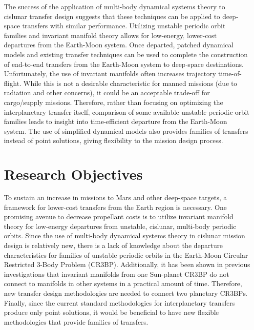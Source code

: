 The success of the application of multi-body dynamical systems theory to cislunar transfer design
suggests that these techniques can be applied to deep-space transfers with similar performance.
Utilizing unstable periodic orbit families and invariant manifold theory allows for low-energy,
lower-cost departures from the Earth-Moon system. Once departed, patched dynamical models and
existing transfer techniques can be used to complete the construction of end-to-end transfers from
the Earth-Moon system to deep-space destinations. Unfortunately, the use of invariant manifolds
often increases trajectory time-of-flight. While this is not a desirable characteristic for manned
missions (due to radiation and other concerns), it could be an acceptable trade-off for
cargo/supply missions. Therefore, rather than focusing on optimizing the interplanetary transfer
itself, comparison of some available unstable periodic orbit families leads to insight into
time-efficient departure from the Earth-Moon system. The use of simplified dynamical models also
provides families of transfers instead of point solutions, giving flexibility to the mission design
process. 

\section{Research Objectives}
To sustain an increase in missions to Mars and other deep-space targets, a framework for lower-cost
transfers from the Earth region is necessary. One promising avenue to decrease propellant costs is
to utilize invariant manifold theory for low-energy departures from unstable, cislunar, multi-body
periodic orbits. Since the use of multi-body dynamical systems theory in cislunar mission design is
relatively new, there is a lack of knowledge about the departure characteristics for families of
unstable periodic orbits in the Earth-Moon Circular Restricted 3-Body Problem (CR3BP). Additionally,
it has been shown in previous investigations that invariant manifolds from one Sun-planet CR3BP
do not connect to manifolds in other systems in a practical amount of time\cite{Koon:2000}.
Therefore, new transfer design methodologies are needed to connect two planetary CR3BPs. Finally,
since the current standard methodologies for interplanetary transfers produce only point solutions,
it would be beneficial to have new flexible methodologies that provide families of transfers.

